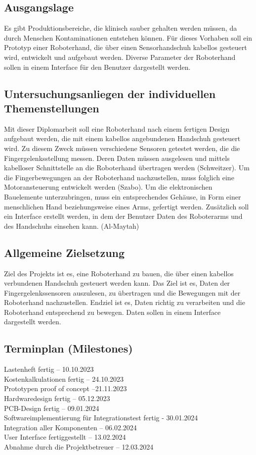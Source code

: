 \documentclass[11pt]{article}
\begin{document}
\subsection{Ausgangslage}
Es gibt Produktionsbereiche, die klinisch sauber gehalten werden müssen, da durch Menschen Kontaminationen entstehen
können. Für dieses Vorhaben soll ein Prototyp einer Roboterhand, die über einen Sensorhandschuh kabellos gesteuert wird,
entwickelt und aufgebaut werden. Diverse Parameter der Roboterhand sollen in einem Interface für den Benutzer 
dargestellt werden.

\subsection{Untersuchungsanliegen der individuellen Themenstellungen}
Mit dieser Diplomarbeit soll eine Roboterhand nach einem fertigen Design aufgebaut werden,
die mit einem kabellos angebundenen Handschuh gesteuert wird. Zu diesem Zweck müssen
verschiedene Sensoren getestet werden, die die Fingergelenksstellung messen. Deren Daten
müssen ausgelesen und mittels kabelloser Schnittstelle an die Roboterhand übertragen werden
(Schweitzer). Um die Fingerbewegungen an der Roboterhand nachzustellen, muss folglich eine
Motoransteuerung entwickelt werden (Szabo). Um die elektronischen Bauelemente
unterzubringen, muss ein entsprechendes Gehäuse, in Form einer menschlichen Hand
beziehungsweise eines Arms, gefertigt werden. Zusätzlich soll ein Interface erstellt werden, in
dem der Benutzer Daten des Roboterarms und des Handschuhs einsehen kann. (Al-Maytah)

\subsection{Allgemeine Zielsetzung}
Ziel des Projekts ist es, eine Roboterhand zu bauen, die über einen kabellos verbundenen
Handschuh gesteuert werden kann. Das Ziel ist es, Daten der Fingergelenkssensoren auszulesen,
zu übertragen und die Bewegungen mit der Roboterhand nachzustellen. Endziel ist es, Daten
richtig zu verarbeiten und die Roboterhand entsprechend zu bewegen. Daten sollen in einem
Interface dargestellt werden.

\subsection{Terminplan (Milestones)}
Lastenheft fertig – 10.10.2023 \\
Kostenkalkulationen fertig – 24.10.2023 \\
Prototypen proof of concept –21.11.2023 \\
Hardwaredesign fertig – 05.12.2023 \\
PCB-Design fertig – 09.01.2024 \\
Softwareimplementierung für Integrationstest fertig - 30.01.2024 \\
Integration aller Komponenten – 06.02.2024 \\
User Interface fertiggestellt – 13.02.2024 \\
Abnahme durch die Projektbetreuer – 12.03.2024
\end{document}
